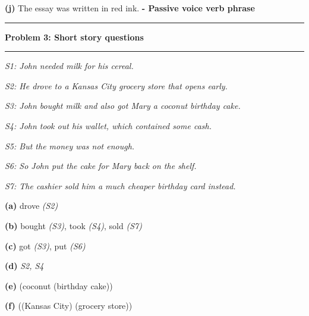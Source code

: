 \documentclass[11pt]{article}
\newcommand\question[2]{\vspace{.25in}\hrule\textbf{#1: #2}\vspace{.5em}\hrule\vspace{.10in}}
\renewcommand\part[1]{\vspace{.10in}\textbf{(#1)}}
\begin{document}
\part{j} The essay was written in red ink. \textbf{- Passive voice verb phrase}

\question{Problem 3}{Short story questions}

\qquad \emph{S1: John needed milk for his cereal.}

\qquad \emph{S2: He drove to a Kansas City grocery store that opens early.}

\qquad \emph{S3: John bought milk and also got Mary a coconut birthday cake.}

\qquad \emph{S4: John took out his wallet, which contained some cash.}

\qquad \emph{S5: But the money was not enough.}

\qquad \emph{S6: So John put the cake for Mary back on the shelf.}

\qquad \emph{S7: The cashier sold him a much cheaper birthday card instead.}

\part{a} drove \emph{(S2)}

\part{b} bought \emph{(S3)}, took \emph{(S4)}, sold \emph{(S7)}

\part{c} got \emph{(S3)}, put \emph{(S6)}

\part{d} \emph{S2, S4}

\part{e} (coconut (birthday cake))

\part{f} ((Kansas City) (grocery store))
\end{document}
